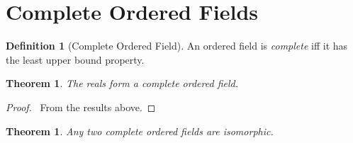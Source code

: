 \documentclass{article}
\let\qed\relax
\newtheorem{theorem}[axiom]{Theorem}
\theoremstyle{definition}
\newtheorem{definition}[axiom]{Definition}
\begin{document}
    \section{Complete Ordered Fields}

    \begin{definition}[Complete Ordered Field]
        An ordered field is \emph{complete} iff it has the least upper bound property.
    \end{definition}

    \begin{theorem}
        The reals form a complete ordered field.
    \end{theorem}

    \begin{proof}
        \pf\ From the results above. \qed
    \end{proof}

    \begin{theorem}
        Any two complete ordered fields are isomorphic.
    \end{theorem}
\end{document}
